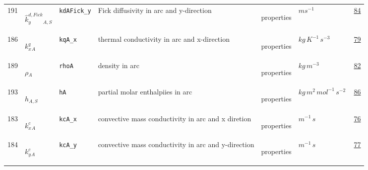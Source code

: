 \begin{longtable}{|p{1cm}|p{2.5cm}|p{4.5cm}|p{8cm}|p{3.0cm}|p{3cm}|p{1cm}|}
                 \\
            191
             & \hypertarget{"v:191"}{ $ {{\hat{k}^{d,Fick}_y}}{_{A, S}} $}
             & \verb|kdAFick_y|
             & Fick diffusivity in arc and y-direction
             & \begin{lay}properties \end{lay}
             & $ m s^{-1} \, $
             &                 \hyperlink{"e:84"}{ 84 }
                 \\
            186
             & \hypertarget{"v:186"}{ $ {{k^q_x}}{_{A}} $}
             & \verb|kqA_x|
             & thermal conductivity in arc and x-direction
             & \begin{lay}properties \end{lay}
             & $ kg \,K^{-1} \,s^{-3} \, $
             &                 \hyperlink{"e:79"}{ 79 }
                 \\
            189
             & \hypertarget{"v:189"}{ $ {{\rho}}{_{A}} $}
             & \verb|rhoA|
             & density in arc
             & \begin{lay}properties \end{lay}
             & $ kg \,m^{-3} \, $
             &                 \hyperlink{"e:82"}{ 82 }
                 \\
            193
             & \hypertarget{"v:193"}{ $ {h}{_{A, S}} $}
             & \verb|hA|
             & partial molar enthalpiies in arc
             & \begin{lay}properties \end{lay}
             & $ kg \,m^{2} \,mol^{-1} \,s^{-2} \, $
             &                 \hyperlink{"e:86"}{ 86 }
                 \\
            183
             & \hypertarget{"v:183"}{ $ {{k^c_x}}{_{A}} $}
             & \verb|kcA_x|
             & convective mass conductivity in arc and x diretion
             & \begin{lay}properties \end{lay}
             & $ m^{-1} \,s \, $
             &                 \hyperlink{"e:76"}{ 76 }
                 \\
            184
             & \hypertarget{"v:184"}{ $ {{k^c_y}}{_{A}} $}
             & \verb|kcA_y|
             & convective mass conductivity in arc and y-direction
             & \begin{lay}properties \end{lay}
             & $ m^{-1} \,s \, $
             &                 \hyperlink{"e:77"}{ 77 }

\end{longtable}
